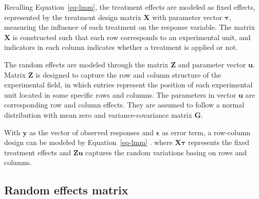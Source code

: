 \documentclass[
  a4paper,
  oneside,
  openany,
  12pt,
  onecolumn]{book}
\theoremstyle{definition}
\theoremstyle{plain}
\theoremstyle{remark}
\begin{document}
Recalling Equation~\ref{eq-lmm}, the treatment effects are modeled as
fixed effects, represented by the treatment design matrix
\(\boldsymbol{X}\) with parameter vector \(\boldsymbol{\tau}\),
measuring the influence of each treatment on the response variable. The
matrix \(\boldsymbol{X}\) is constructed such that each row corresponds
to an experimental unit, and indicators in each column indicates whether
a treatment is applied or not.

The random effects are modeled through the matrix \(\boldsymbol{Z}\) and
parameter vector \(\boldsymbol{u}\). Matrix \(\boldsymbol{Z}\) is
designed to capture the row and column structure of the experimental
field, in which entries represent the position of each experimental unit
located in some specific rows and columns. The parameters in vector
\(\boldsymbol{u}\) are corresponding row and column effects. They are
assumed to follow a normal distribution with mean zero and
variance-covariance matrix \(\boldsymbol{G}\).

With \(\boldsymbol{y}\) as the vector of observed responses and
\(\boldsymbol{\epsilon}\) as error term, a row-column design can be
modeled by Equation~\ref{eq-lmm} . where \(\boldsymbol{X\tau}\)
represents the fixed treatment effects and \(\boldsymbol{Zu}\) captures
the random variations basing on rows and columns.

\subsection{Random effects matrix}\label{random-effects-matrix}
\end{document}
